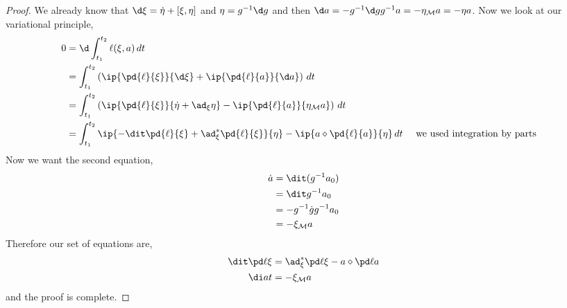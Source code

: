 \begin{proof}
  We already know that $\d \xi = \dot \eta + [\xi, \eta]$ and $\eta = g^{-1}\d g$ and then $\d a = -g^{-1}\d g g^{-1} a = -\eta_{\mathcal{M}} a = -\eta a$. Now we look at our variational principle,
  \begin{align*}
    0 &= \d\int_{t_1}^{t_2} \ell(\xi, a)\, dt \\
    &= \int_{t_1}^{t_2} \left(\ip{\pd{\ell}{\xi}}{\d \xi} + \ip{\pd{\ell}{a}}{\d a}\right)\, dt \\
    &= \int_{t_1}^{t_2} \left(\ip{\pd{\ell}{\xi}}{\dot \eta + \ad_{\xi} \eta} - \ip{\pd{\ell}{a}}{\eta_\mathcal{M}a}\right)\, dt \\
    &= \int_{t_1}^{t_2} \ip{ -\dit \pd{\ell}{\xi} + \ad^*_\xi \pd{\ell}{\xi}}{\eta} - \ip{a \diamond \pd{\ell}{a}}{\eta}\, dt && \text{ we used integration by parts}
  \end{align*}
  Now we want the second equation,
  \begin{align*}
    \dot a &= \dit (g^{-1}a_0) \\
    &= \dit g^{-1} a_0 \\
    &= -g^{-1}\dot g g^{-1} a_0 \\
    &= -\xi_\mathcal{M} a
  \end{align*}
  Therefore our set of equations are,
  \begin{align}
    \dit\pd \ell \xi &= \ad^*_\xi \pd \ell \xi - a\diamond \pd \ell a\\
    \di a t &= -\xi_\mathcal{M}a
  \end{align}
  and the proof is complete.
\end{proof}

